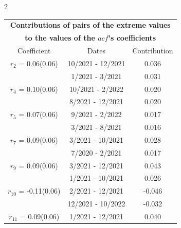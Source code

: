 
\thispagestyle{empty}
\begin{multicols}{2}{ 
\begin{tabular}{ccc}
\multicolumn{3}{c}{\textbf{Contributions of pairs of the extreme values} }  \vspace{-.10in}  \\ 
\multicolumn{3}{c}{ \textbf{to the values of the $acf$'s coefficients}} \\ 
\hline 
\hline                  Coefficient  &  Dates &  Contribution \\ 
\hline 
  $r_{ 2}$ = 0.06(0.06) &      10/2021 - 12/2021 &        0.036   \vspace{-.10in} \\  
&        1/2021 -  3/2021 &        0.031  \vspace{-.02in} \\ \hline 
  $r_{ 4}$ = 0.10(0.06) &      10/2021 -  2/2022 &        0.020   \vspace{-.10in} \\  
&        8/2021 - 12/2021 &        0.020  \vspace{-.02in} \\ \hline 
  $r_{ 5}$ = 0.07(0.06) &       9/2021 -  2/2022 &        0.017   \vspace{-.10in} \\  
&        3/2021 -  8/2021 &        0.016  \vspace{-.02in} \\ \hline 
  $r_{ 7}$ = 0.09(0.06) &       3/2021 - 10/2021 &        0.028   \vspace{-.10in} \\  
&        7/2020 -  2/2021 &        0.017  \vspace{-.02in} \\ \hline 
  $r_{ 9}$ = 0.09(0.06) &       3/2021 - 12/2021 &        0.043   \vspace{-.10in} \\  
&        1/2021 - 10/2021 &        0.026  \vspace{-.02in} \\ \hline 
  $r_{10}$ = -0.11(0.06) &       2/2021 - 12/2021 &       -0.046    \vspace{-.10in} \\ 
  &       12/2021 - 10/2022 &       -0.032  \vspace{-.02in}   \\ \hline 
    $r_{11}$ = 0.09(0.06) &       1/2021 - 12/2021 &        0.040   \vspace{-.10in} \\  

\end{tabular}}
\end{multicols}
